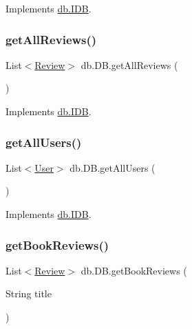 Implements \hyperlink{interfacedb_1_1_i_d_b_abd0d41674bbcdd524a3ca2403504bf25}{db.\+I\+DB}.

\mbox{\label{classdb_1_1_d_b_ac7a84c5621f4ad2263cd830dbf10842e}} 
\subsubsection{\texorpdfstring{get\+All\+Reviews()}{getAllReviews()}}
{\footnotesize\ttfamily List$<$\hyperlink{classserver_1_1data_1_1_review}{Review}$>$ db.\+D\+B.\+get\+All\+Reviews (\begin{DoxyParamCaption}{ }\end{DoxyParamCaption})}



Implements \hyperlink{interfacedb_1_1_i_d_b_a08f60c8b923599c650f04b4192d00d55}{db.\+I\+DB}.

\mbox{\label{classdb_1_1_d_b_ad02e4c78f9afe64af34fb2e5889ce501}} 
\subsubsection{\texorpdfstring{get\+All\+Users()}{getAllUsers()}}
{\footnotesize\ttfamily List$<$\hyperlink{classserver_1_1data_1_1_user}{User}$>$ db.\+D\+B.\+get\+All\+Users (\begin{DoxyParamCaption}{ }\end{DoxyParamCaption})}



Implements \hyperlink{interfacedb_1_1_i_d_b_a39ad15619eae3d0ec652e1849e3ebd50}{db.\+I\+DB}.

\mbox{\label{classdb_1_1_d_b_a02a42ee97d8e7189733dfc720a05452e}} 
\subsubsection{\texorpdfstring{get\+Book\+Reviews()}{getBookReviews()}}
{\footnotesize\ttfamily List$<$\hyperlink{classserver_1_1data_1_1_review}{Review}$>$ db.\+D\+B.\+get\+Book\+Reviews (\begin{DoxyParamCaption}\item[{String}]{title }\end{DoxyParamCaption})}



